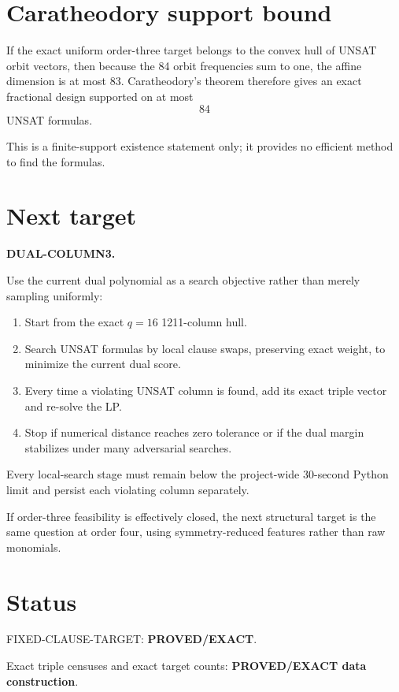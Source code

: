 \documentclass[11pt]{article}
\begin{document}
\section{Caratheodory support bound}

If the exact uniform order-three target belongs to the convex hull of UNSAT
orbit vectors, then because the 84 orbit frequencies sum to one, the affine
dimension is at most 83.  Caratheodory's theorem therefore gives an exact
fractional design supported on at most
\[
\boxed{84}
\]
UNSAT formulas.

This is a finite-support existence statement only; it provides no efficient
method to find the formulas.

\section{Next target}

\textbf{DUAL-COLUMN3.}

Use the current dual polynomial as a search objective rather than merely
sampling uniformly:

\begin{enumerate}
\item Start from the exact \(q=16\) 1211-column hull.
\item Search UNSAT formulas by local clause swaps, preserving exact weight,
to minimize the current dual score.
\item Every time a violating UNSAT column is found, add its exact triple
vector and re-solve the LP.
\item Stop if numerical distance reaches zero tolerance or if the dual margin
stabilizes under many adversarial searches.
\end{enumerate}

Every local-search stage must remain below the project-wide 30-second Python
limit and persist each violating column separately.

If order-three feasibility is effectively closed, the next structural target
is the same question at order four, using symmetry-reduced features rather
than raw monomials.

\section{Status}

FIXED-CLAUSE-TARGET: \textbf{PROVED/EXACT}.

Exact triple censuses and exact target counts: \textbf{PROVED/EXACT data
construction}.
\end{document}
